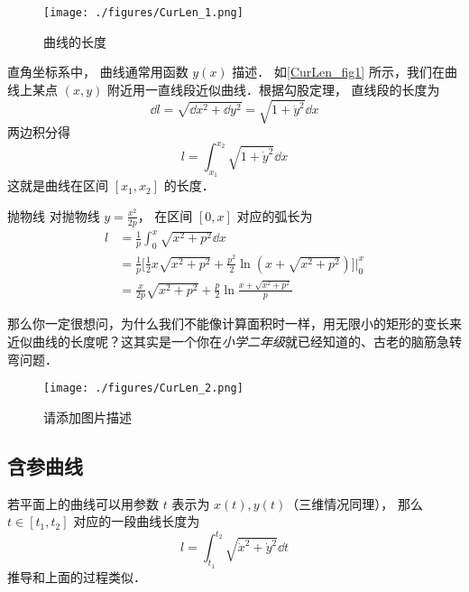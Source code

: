 
\begin{figure}[ht]
\centering
\texttt{[image: ./figures/CurLen\_1.png]}
\caption{曲线的长度} \label{CurLen_fig1}
\end{figure}

直角坐标系中， 曲线通常用函数 $y(x)$ 描述． 如\autoref{CurLen_fig1} 所示，我们在曲线上某点 $(x, y)$ 附近用一直线段近似曲线．根据勾股定理， 直线段的长度为
\begin{equation}
\dd{l} = \sqrt{\dd{x}^2 + \dd{y}^2} = \sqrt{1 + \dot y^2} \dd{x}
\end{equation}
两边积分得
\begin{equation}\label{CurLen_eq1}
l = \int_{x_1}^{x_2} \sqrt{1 + \dot y^2} \dd{x}
\end{equation}
这就是曲线在区间 $[x_1, x_2]$ 的长度．

\begin{example}{抛物线}
对抛物线 $y=\frac{x^2}{2p}$， 在区间 $[0,x]$ 对应的弧长为
\begin{equation}
\begin{aligned}
l& = \frac{1}{p}\int_{0}^{x}\sqrt{x^2+p^2}\dd{x}\\
&=\frac{1}{p}\bigg[\frac{1}{2}x\sqrt{x^2+p^2}+\frac{p^2}{2}\ln(x+\sqrt{x^2+p^2})\bigg]\Bigg\lvert_{0}^{x}\\
&=\frac{x}{2p}\sqrt{x^2+p^2}+\frac{p}{2}\ln\frac{x+\sqrt{x^2+p^2}}{p}
\end{aligned}
\end{equation}
\end{example}

那么你一定很想问，为什么我们不能像计算面积时一样，用无限小的矩形的变长来近似曲线的长度呢？这其实是一个你在\textsl{小学二年级}就已经知道的、古老的脑筋急转弯问题．
\begin{figure}[ht]
\centering
\texttt{[image: ./figures/CurLen\_2.png]}
\caption{请添加图片描述} \label{CurLen_fig2}
\end{figure}

\subsection{含参曲线}
若平面上的曲线可以用参数 $t$ 表示为 $x(t), y(t)$（三维情况同理）， 那么 $t \in [t_1, t_2]$ 对应的一段曲线长度为
\begin{equation}\label{CurLen_eq2}
l = \int_{t_1}^{t_2} \sqrt{\dot x^2 + \dot y^2} \dd{t}
\end{equation}
推导和上面的过程类似．

